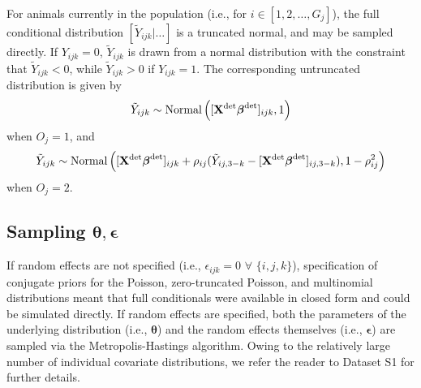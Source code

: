 \documentclass[10pt]{article}
\begin{document}
For animals currently in the population (i.e., for $i \in [1,2,\hdots,G_j]$), the full conditional distribution $[ \tilde{Y}_{ijk} | \hdots]$ is a truncated normal, and may be sampled directly.  If $Y_{ijk}=0$, $\tilde{Y}_{ijk}$ is drawn from a normal distribution with the constraint that $\tilde{Y}_{ijk}<0$, while $\tilde{Y}_{ijk}>0$ if $Y_{ijk}=1$.  The corresponding untruncated distribution is given by
$$
\tilde{Y}_{ijk} \sim \textrm{Normal} \left( [{\bf X}^{\rm det} \boldsymbol{\beta}^{\rm det}]_{ijk},1  \right)
$$
when $O_j=1$, and
$$
\tilde{Y}_{ijk} \sim \textrm{Normal} \left( [{\bf X}^{\rm det} \boldsymbol{\beta}^{\rm det}]_{ijk}+\rho_{ij}(\tilde{Y}_{ij,3-k}-[{\bf X}^{\rm det} \boldsymbol{\beta}^{\rm det}]_{ij,3-k}),1-\rho_{ij}^2  \right)
$$
when $O_j=2$.

\subsection*{Sampling $\boldsymbol{\theta}, \boldsymbol{\epsilon}$}

If random effects are not specified (i.e., $\epsilon_{ijk}=0$ $\forall$ $\{i,j,k\}$), specification of conjugate priors for the Poisson, zero-truncated Poisson, and multinomial distributions meant that full conditionals were available in closed form and could be simulated directly.  If random effects are specified, both the parameters of the underlying distribution (i.e., $\boldsymbol{\theta}$) and the random effects themselves (i.e., $\boldsymbol{\epsilon}$)
are sampled via the Metropolis-Hastings algorithm.  Owing to the relatively large number of individual covariate distributions, we refer the reader to Dataset S1 for further details.


\clearpage
\end{document}

